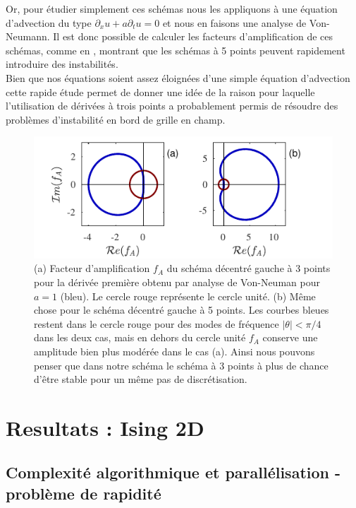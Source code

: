 \documentclass[10.5pt]{article}
\begin{document}
\begin{multicols}{2}
Or, pour étudier simplement ces schémas nous les appliquons à une équation d'advection du type $\partial_x u + a \partial_t u = 0$ et nous en faisons une analyse de Von-Neumann. Il est donc possible de calculer les facteurs d'amplification de ces schémas, comme en , montrant que les schémas à 5 points peuvent rapidement introduire des instabilités.\\

Bien que nos équations soient assez éloignées d'une simple équation d'advection cette rapide étude permet de donner une idée de la raison pour laquelle l'utilisation de dérivées à trois points a probablement permis de résoudre des problèmes d'instabilité en bord de grille en champ.

\begin{figure}[H]
\begin{center}
	\includegraphics[width=0.95\columnwidth]{FacAmp.pdf}
\end{center}
\caption{(a) Facteur d'amplification $f_A$ du schéma décentré gauche à 3 points pour la dérivée première obtenu par analyse de Von-Neuman pour $a=1$ (bleu). Le cercle rouge représente le cercle unité. (b) Même chose pour le schéma décentré gauche à 5 points. Les courbes bleues restent dans le cercle rouge pour des modes de fréquence $|\theta| < \pi/4$ dans les deux cas, mais en dehors du cercle unité $f_A$ conserve une amplitude bien plus modérée dans le cas (a). Ainsi nous pouvons penser que dans notre schéma le schéma à 3 points à plus de chance d'être stable pour un même pas de discrétisation.}
\label{fig:FacAmp}
\end{figure}


\section{Resultats : Ising 2D}
\label{sec:ResIsing}
\subsection{Complexité algorithmique et parallélisation - problème de rapidité} 



\end{multicols}
\end{document}
